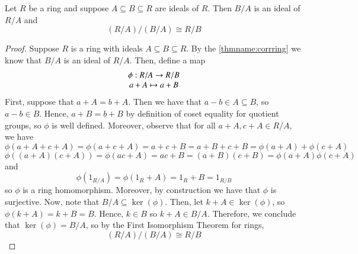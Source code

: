 \documentclass[12pt, a4paper, oneside, openright, titlepage]{book}
\begin{document}
\begin{namthm}
    Let $R$ be a ring and suppose $A \subseteq B \subseteq R$ are ideals of $R$. Then $B/A$ is an ideal of $R/A$ and \begin{equation}
        (R/A)/(B/A) \cong R/B
    \end{equation}
    \begin{center}
        \end{center}
\end{namthm}
\begin{proof}
    Suppose $R$ is a ring with ideals $A \subseteq B \subseteq R$. By the \ref{thmname:corrring} we know that $B/A$ is an ideal of $R/A$. Then, define a map $$\begin{array}{c} \phi: R/A\rightarrow R/B \\ a+A \mapsto a+ B \end{array}$$
    First, suppose that $a+A = b+A$. Then we have that $a-b \in A \subseteq B$, so $a - b \in B$. Hence, $a + B = b + B$ by definition of coset equality for quotient groups, so $\phi$ is well defined. Moreover, observe that for all $a+A,c+A \in R/A$, we have $$\phi(a+A+c+A) = \phi(a+c+A) = a+c+B = a+B+c+B = \phi(a+A)+\phi(c+A)$$
    $$\phi((a+A)(c+A)) = \phi(ac+A) = ac+B = (a+B)(c+B) = \phi(a+A)\phi(c+A)$$
    and $$\phi(1_{R/A})=\phi(1_R+A) = 1_R + B = 1_{R/B}$$
    so $\phi$ is a ring homomorphism. Moreover, by construction we have that $\phi$ is surjective. Now, note that $B/A \subseteq \ker(\phi)$. Then, let $k+A \in \ker(\phi)$, so $\phi(k+A) = k+B = B$. Hence, $k \in B$ so $k+A \in B/A$. Therefore, we conclude that $\ker(\phi) = B/A$, so by the First Isomorphism Theorem for rings, \begin{equation}
        (R/A)/(B/A) \cong R/B
    \end{equation}
\end{proof}
\end{document}
